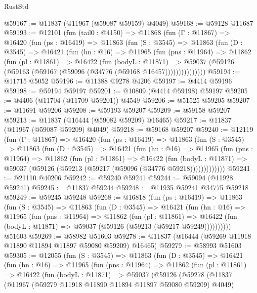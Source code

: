 \begin{lexlean}{RustStd}
\begin{coremodule}
@59167 := @11837 (@11967 (@59087 @59159) @4049)
@59168 := @59128 @11687
@59193 := @12101
    (fun (tail0 : @4150) =>
    @11868
      (fun (Γ : @11867) =>
      @16420
        (fun (ps : @16419) =>
        @11863
          (fun (S : @3545) =>
          @11863
            (fun (D : @3545) =>
            @16421
              (fun (hn : @16) =>
              @11965
                (fun (pns : @11964) =>
                @11862
                  (fun (pl : @11861) =>
                  @16422
                    (fun (bodyL : @11871) =>
                    @59037 (@59126 (@59163 (@59167 (@59096 (@34776 (@59168 @16457)))))))))))))))
@59194 := @11715 @5052
@59196 := @11388 @9278 @4206
@59197 := @4414 @59196
@59198 := @59194 @59197
@59201 := @10809 (@4414 @59198) @59197
@59205 := @4406 (@11704 (@11709 @59201)) @4549
@59206 := @51525 @59205
@59207 := @11691 @59206
@59208 := @59193 @59207
@59209 := @59158 @59207
@59213 := @11837 (@16444 (@59082 @59209) @16465)
@59217 := @11837 (@11967 (@59087 @59209) @4049)
@59218 := @59168 @59207
@59240 := @12119
    (fun (Γ : @11867) =>
    @16420
      (fun (ps : @16419) =>
      @11863
        (fun (S : @3545) =>
        @11863
          (fun (D : @3545) =>
          @16421
            (fun (hn : @16) =>
            @11965
              (fun (pns : @11964) =>
              @11862
                (fun (pl : @11861) =>
                @16422
                  (fun (bodyL : @11871) =>
                  @59037 (@59126 (@59213 (@59217 (@59096 (@34776 @59218)))))))))))))
@59241 := @21110 @40206
@59242 := @59240 @59241
@59244 := @59094 (@11928 @59241)
@59245 := @11837 @59244
@59248 := @11935 @59241 @34775 @59218
@59249 := @59245 @59248
@59268 := @16818
    (fun (ps : @16419) =>
    @11863
      (fun (S : @3545) =>
      @11863
        (fun (D : @3545) =>
        @16421
          (fun (hn : @16) =>
          @11965
            (fun (pns : @11964) =>
            @11862
              (fun (pl : @11861) =>
              @16422 (fun (bodyL : @11871) => @59037 (@59126 (@59213 (@59217 @59249))))))))))
    @51603
@59269 := @58982 @51603
@59278 := @11837 (@16444 (@59269 @11918 @11890 @11894 @11897 @59080 @59209) @16465)
@59279 := @58993 @51603
@59305 := @12055
    (fun (S : @3545) =>
    @11863
      (fun (D : @3545) =>
      @16421
        (fun (hn : @16) =>
        @11965
          (fun (pns : @11964) =>
          @11862
            (fun (pl : @11861) =>
            @16422
              (fun (bodyL : @11871) =>
              @59037
                (@59126
                  (@59278
                    (@11837
                      (@11967 (@59279 @11918 @11890 @11894 @11897 @59080 @59209) @4049)

\end{coremodule}
\end{lexlean}
